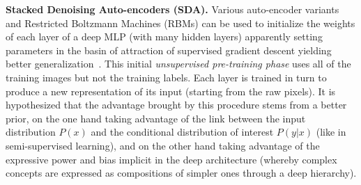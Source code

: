 \documentclass{article} %
\begin{document}
{\bf Stacked Denoising Auto-encoders (SDA).}
Various auto-encoder variants and Restricted Boltzmann Machines (RBMs)
can be used to initialize the weights of each layer of a deep MLP (with many hidden 
layers)
apparently setting parameters in the
basin of attraction of supervised gradient descent yielding better 
generalization~\citep{Erhan+al-2010}.  This initial {\em unsupervised
pre-training phase} uses all of the training images but not the training labels.
Each layer is trained in turn to produce a new representation of its input
(starting from the raw pixels).
It is hypothesized that the
advantage brought by this procedure stems from a better prior,
on the one hand taking advantage of the link between the input
distribution $P(x)$ and the conditional distribution of interest
$P(y|x)$ (like in semi-supervised learning), and on the other hand
taking advantage of the expressive power and bias implicit in the
deep architecture (whereby complex concepts are expressed as
compositions of simpler ones through a deep hierarchy).

\end{document}
